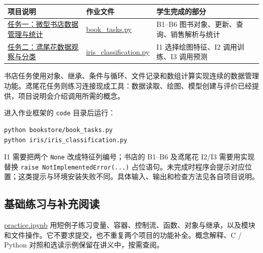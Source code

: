 \documentclass[UTF8,a4paper,11pt,fontset=fandol]{ctexart}
\providecommand{\passthrough}[1]{#1}
\begin{document}
\begin{longtable}[]{@{}
  >{\raggedright\arraybackslash}p{}
  >{\raggedright\arraybackslash}p{}
  >{\raggedright\arraybackslash}p{}@{}}
\toprule\noalign{}
\begin{minipage}[b]{\linewidth}\raggedright
项目说明
\end{minipage} & \begin{minipage}[b]{\linewidth}\raggedright
作业文件
\end{minipage} & \begin{minipage}[b]{\linewidth}\raggedright
学生完成的部分
\end{minipage} \\
\midrule\noalign{}
\endhead
\bottomrule\noalign{}
\endlastfoot
\href{code/bookstore/README.md}{任务一：微型书店数据管理与统计} & \href{code/bookstore/book_tasks.py}{book\_tasks.py} & B1--B6 图书对象、更新、查询、销售解析与统计 \\
\href{code/iris/README.md}{任务二：鸢尾花数据观察与分类} & \href{code/iris/iris_classification.py}{iris\_classification.py} & I1 选择绘图特征、I2 调用训练、I3 调用预测 \\
\end{longtable}

书店任务使用对象、继承、条件与循环、文件记录和数组计算实现连续的数据管理功能。鸢尾花任务则练习连接现成工具：数据读取、绘图、模型创建与评价已经提供，项目说明会介绍调用所需的概念。

进入作业框架的 \passthrough{\lstinline!code!} 目录后运行：

\begin{lstlisting}[language={}]
python bookstore/book_tasks.py
python iris/iris_classification.py
\end{lstlisting}

I1 需要把两个 \passthrough{\lstinline!None!} 改成特征列编号；书店的 B1--B6 及鸢尾花 I2/I3 需要用实现替换 \passthrough{\lstinline!raise NotImplementedError(...)!} 占位语句。未完成时程序会提示对应位置；这类提示与环境安装失败不同。具体输入、输出和检查方法见各自项目说明。

\subsection{基础练习与补充阅读}\label{ux57faux7840ux7ec3ux4e60ux4e0eux8865ux5145ux9605ux8bfb}

\href{code/practice.ipynb}{practice.ipynb} 用短例子练习变量、容器、控制流、函数、对象与继承，以及模块和文件操作。它不要求提交，也不重复两个项目的功能补全。概念解释、C / Python 对照和选读示例保留在讲义中，按需查阅。
\end{document}
